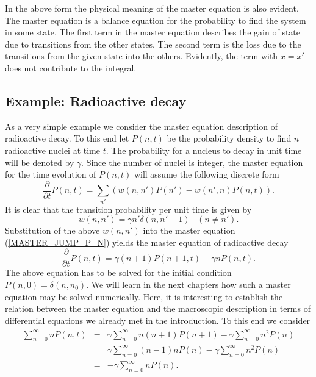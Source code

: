 In the above form the physical meaning of the master equation is 
also evident. The master equation is a balance equation for the
probability to find the system in some state. The first term in 
the master equation describes the gain of state due to transitions 
from the other states. The second term is the loss due to the 
transitions from the given state into the others. Evidently,
the term with $x=x'$ does not contribute to the integral.

\subsection{Example: Radioactive decay}
As a very simple example we consider the master equation 
description of radioactive decay. To this end let
$P(n,t)$ be the probability density to find $n$ radioactive nuclei
at time $t$. The probability for a nucleus to decay in unit time will
be denoted by $\gamma$. Since the number of nuclei is integer,
the master equation for the time evolution of $P(n,t)$ will assume 
the following discrete form
\begin{equation}
\label{MASTER_JUMP_P_N}
\frac{\partial}{\partial t} P(n,t) =
 \sum_{n'} \left( w(n,n') P(n')
 - w(n',n) P(n,t) \right).
\end{equation}
It is clear that the transition probability per unit time is given 
by
\begin{equation*}
w(n,n') = \gamma n' \delta(n,n'-1) \;\;\; (n \neq n').
\end{equation*}
Substitution of the above $w(n,n')$ into the master equation
(\ref{MASTER_JUMP_P_N}) yields the master equation of radioactive 
decay
\begin{equation}
\frac{\partial}{\partial t} P(n,t) = 
\gamma (n+1) P(n+1,t) - \gamma n P(n,t).
\end{equation}
The above equation has to be solved for the initial condition
$P(n,0)= \delta(n,n_0)$. 
We will learn in the next chapters how such a master equation may 
be solved numerically. Here, it is interesting to establish the
relation between the master equation and the macroscopic 
description in terms of differential equations we already met in 
the introduction.
To this end we consider
\begin{eqnarray*}
\sum_{n=0}^{\infty} n \dot{P}(n,t) &=&
       \gamma \sum_{n=0}^{\infty} n(n+1)P(n+1) 
         - \gamma  \sum_{n=0}^{\infty} n^2 P(n) \\
  &=& \gamma \sum_{n=0}^{\infty} (n-1)n P(n) 
         - \gamma  \sum_{n=0}^{\infty} n^2 P(n) \\
  & = & - \gamma \sum_{n=0}^{\infty} n P(n) .
\end{eqnarray*}
